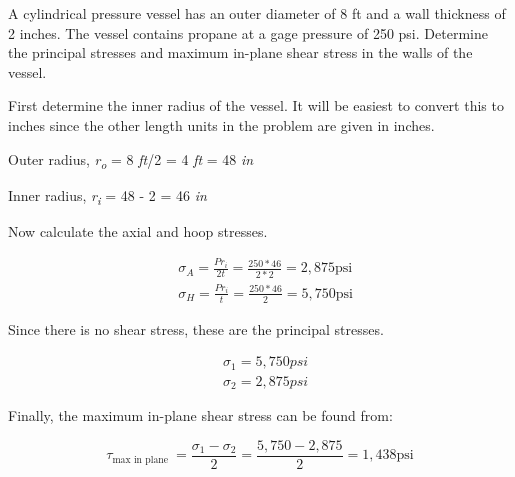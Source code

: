 \documentclass[
  letterpaper,
  DIV=11,
  numbers=noendperiod]{scrreprt}
\begin{document}
\begin{tcolorbox}[enhanced jigsaw, breakable, opacityback=0, toptitle=1mm, left=2mm, colback=white, opacitybacktitle=0.6, colframe=quarto-callout-note-color-frame, titlerule=0mm, arc=.35mm, leftrule=.75mm, bottomtitle=1mm, colbacktitle=quarto-callout-note-color!10!white, rightrule=.15mm, title={Example 13.1: Needs title}, bottomrule=.15mm, toprule=.15mm, coltitle=black]

A cylindrical pressure vessel has an outer diameter of 8 ft and a wall
thickness of 2 inches. The vessel contains propane at a gage pressure of
250 psi. Determine the principal stresses and maximum in-plane shear
stress in the walls of the vessel.

\begin{tcolorbox}[enhanced jigsaw, breakable, opacityback=0, toptitle=1mm, left=2mm, colback=white, opacitybacktitle=0.6, colframe=quarto-callout-note-color-frame, titlerule=0mm, arc=.35mm, leftrule=.75mm, bottomtitle=1mm, colbacktitle=quarto-callout-note-color!10!white, rightrule=.15mm, title={Solution}, bottomrule=.15mm, toprule=.15mm, coltitle=black]

First determine the inner radius of the vessel. It will be easiest to
convert this to inches since the other length units in the problem are
given in inches.

Outer radius, \emph{r\textsubscript{o}} = 8 \emph{ft}/2 = 4 \emph{ft} =
48 \emph{in}

Inner radius, \emph{r\textsubscript{i}} = 48 - 2 = 46 \emph{in}

Now calculate the axial and hoop stresses.

\[
\begin{aligned}
& \sigma_A=\frac{P r_i}{2 t}=\frac{250 * 46}{2 * 2}=2,875 \mathrm{psi} \\
& \sigma_H=\frac{P r_i}{t}=\frac{250 * 46}{2}=5,750 \mathrm{psi}
\end{aligned}
\]

Since there is no shear stress, these are the principal stresses.

\[
\begin{aligned}
& \sigma_1=5,750 p s i \\
& \sigma_2=2,875 p s i
\end{aligned}
\]

Finally, the maximum in-plane shear stress can be found from:

\[
\tau_{\max \text { in plane }}=\frac{\sigma_1-\sigma_2}{2}=\frac{5,750-2,875}{2}=1,438 \mathrm{psi}
\]

\end{tcolorbox}

\end{tcolorbox}
\end{document}
